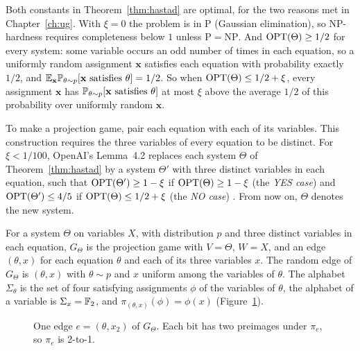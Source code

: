 Both constants in Theorem~\ref{thm:hastad} are optimal, for the two reasons met in Chapter~\ref{ch:ug}. With $\xi=0$ the problem is in P (Gaussian elimination), so NP-hardness requires completeness below $1$ unless $\mathrm{P}=\mathrm{NP}$. And $\operatorname{OPT}(\Theta)\ge1/2$ for every system: some variable occurs an odd number of times in each equation, so a uniformly random assignment $\mathbf x$ satisfies each equation with probability exactly $1/2$, and $\mathbb{E}_{\mathbf x}\mathbb{P}_{\theta\sim p}[\mathbf x\text{ satisfies }\theta]=1/2$. So when $\operatorname{OPT}(\Theta)\le1/2+\xi$, every assignment $\mathbf x$ has $\mathbb{P}_{\theta\sim p}[\mathbf x\text{ satisfies }\theta]$ at most $\xi$ above the average $1/2$ of this probability over uniformly random $\mathbf x$.

To make a projection game, pair each equation with each of its variables. This construction requires the three variables of every equation to be distinct. For $\xi<1/100$, OpenAI's Lemma~4.2 replaces each system $\Theta$ of Theorem~\ref{thm:hastad} by a system $\Theta'$ with three distinct variables in each equation, such that $\operatorname{OPT}(\Theta')\ge1-\xi$ if $\operatorname{OPT}(\Theta)\ge1-\xi$ (the \emph{YES case}) and $\operatorname{OPT}(\Theta')\le4/5$ if $\operatorname{OPT}(\Theta)\le1/2+\xi$ (the \emph{NO case}) \cite[Lemma~4.2]{OAI}. From now on, $\Theta$ denotes the new system.

\begin{definition}\label{def:evv}
For a system $\Theta$ on variables $X$, with distribution $p$ and three distinct variables in each equation, $G_\Theta$ is the projection game with $V=\Theta$, $W=X$, and an edge $(\theta,x)$ for each equation $\theta$ and each of its three variables $x$. The random edge of $G_\Theta$ is $(\theta,x)$ with $\theta\sim p$ and $x$ uniform among the variables of $\theta$. The alphabet $\Sigma_\theta$ is the set of four satisfying assignments $\phi$ of the variables of $\theta$, the alphabet of a variable is $\Sigma_x=\mathbb{F}_2$, and $\pi_{(\theta,x)}(\phi)=\phi(x)$ (Figure~\ref{fig:evv}).
\end{definition}

\begin{figure}[ht]
\centering
{}
\caption{One edge $e=(\theta,x_2)$ of $G_\Theta$. Each bit has two preimages under $\pi_e$, so $\pi_e$ is 2-to-1.}\label{fig:evv}
\end{figure}

